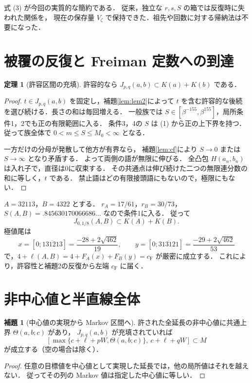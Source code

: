 \documentclass[10pt,a4paper]{article}
\theoremstyle{definition}
\newtheorem{theorem}{定理}
\newtheorem{lemma}{補題}
\newcommand{\CF}{c_{\mathrm F}}
\begin{document}
式 (3) が今回の実質的な簡約である．
従来，独立な $r,s,S$ の箱では反復時に失われた関係を，
現在の保存量 $V_\zeta$ で保持できた．祖先や回数に対する帰納法は不要になった．

\section{被覆の反復と Freiman 定数への到達}
\begin{theorem}[許容区間の充填]\label{thm:filling}
許容的なら $J_{p,q}(a,b)\subset K(a)+K(b)$ である．
\end{theorem}
\begin{proof}
$t\in J_{p,q}(a,b)$ を固定し，補題\ref{lem:lem2}によって
$t$ を含む許容的な後続を選び続ける．長さの和は毎回増える．
一般族では $S\in[\beta^{-155},\beta^{155}]$，局所条件1，2でも正の有限範囲に入る．
条件3，4の $S$ は (1) から正の上下界を持つ．
従って族全体で $0<m\le S\le M_0<\infty$ となる．

一方だけの分母が発散して他方が有界なら，
補題\ref{lem:cf}により $S\to0$ または $S\to\infty$ となり矛盾する．
よって両側の語が無限に伸びる．
全凸包 $H(a_n,b_n)$ は入れ子で，直径は0に収束する．
その共通点は伸び続けた二つの無限連分数の和に等しく，$t$ である．
禁止語はどの有限接頭語にもないので，極限にもない．
\end{proof}

$A=32113$，$B=4322$ とする．
$r_A=17/61$，$r_B=30/73$，$S(A,B)=.845630170066686\ldots$ なので条件1に入る．
従って
\[
 J_{0,1/8}(A,B)\subset K(A)+K(B).
\]
極値尾は
\[
 x=[0;\overline{131213}]=\frac{-28+2\sqrt{462}}{19},
 \qquad
 y=[0;\overline{313121}]=\frac{-29+2\sqrt{462}}{53}
\]
で，$4+\ell(A,B)=4+F_A(x)+F_B(y)=\CF$ が厳密に成立する．
これにより，許容性と補題2の反復から左端 $\CF$ に届く．

\section{非中心値と半直線全体}
\begin{lemma}[中心値の実現から Markov 区間へ]\label{lem:markov}
許された全延長の非中心値に共通上界 $\Theta(a,b;c)$ があり，
$J_{p,q}(a,b)$ が充填されていれば
\[
 [\max\{c+\ell+pW,\Theta(a,b;c)\},\ c+\ell+qW]\subset M
\]
が成立する（空の場合は除く）．
\end{lemma}
\begin{proof}
任意の目標値を中心値として実現した延長では，他の局所値はそれを越えない．
従ってその列の Markov 値は指定した中心値に等しい．
\end{proof}
\end{document}
